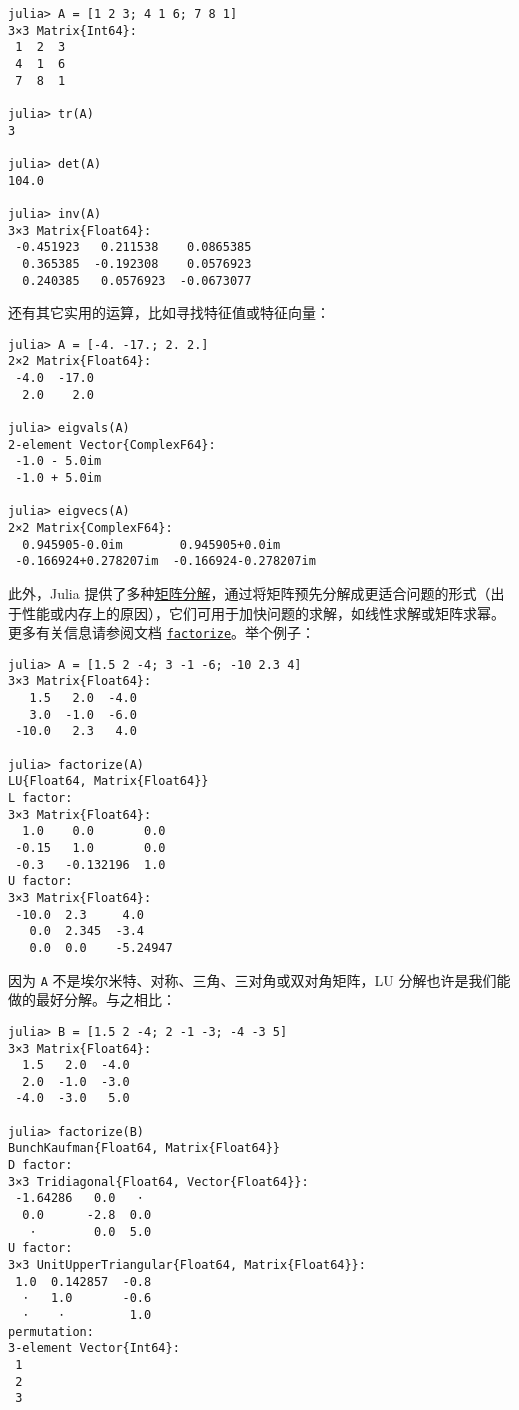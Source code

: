 \begin{verbatim}
julia> A = [1 2 3; 4 1 6; 7 8 1]
3×3 Matrix{Int64}:
 1  2  3
 4  1  6
 7  8  1

julia> tr(A)
3

julia> det(A)
104.0

julia> inv(A)
3×3 Matrix{Float64}:
 -0.451923   0.211538    0.0865385
  0.365385  -0.192308    0.0576923
  0.240385   0.0576923  -0.0673077
\end{verbatim}



还有其它实用的运算，比如寻找特征值或特征向量：




\begin{verbatim}
julia> A = [-4. -17.; 2. 2.]
2×2 Matrix{Float64}:
 -4.0  -17.0
  2.0    2.0

julia> eigvals(A)
2-element Vector{ComplexF64}:
 -1.0 - 5.0im
 -1.0 + 5.0im

julia> eigvecs(A)
2×2 Matrix{ComplexF64}:
  0.945905-0.0im        0.945905+0.0im
 -0.166924+0.278207im  -0.166924-0.278207im
\end{verbatim}



此外，Julia 提供了多种\hyperlink{14017178414387426770}{矩阵分解}，通过将矩阵预先分解成更适合问题的形式（出于性能或内存上的原因），它们可用于加快问题的求解，如线性求解或矩阵求幂。更多有关信息请参阅文档 \hyperlink{7042962205548658937}{\texttt{factorize}}。举个例子：




\begin{verbatim}
julia> A = [1.5 2 -4; 3 -1 -6; -10 2.3 4]
3×3 Matrix{Float64}:
   1.5   2.0  -4.0
   3.0  -1.0  -6.0
 -10.0   2.3   4.0

julia> factorize(A)
LU{Float64, Matrix{Float64}}
L factor:
3×3 Matrix{Float64}:
  1.0    0.0       0.0
 -0.15   1.0       0.0
 -0.3   -0.132196  1.0
U factor:
3×3 Matrix{Float64}:
 -10.0  2.3     4.0
   0.0  2.345  -3.4
   0.0  0.0    -5.24947
\end{verbatim}



因为 \texttt{A} 不是埃尔米特、对称、三角、三对角或双对角矩阵，LU 分解也许是我们能做的最好分解。与之相比：




\begin{verbatim}
julia> B = [1.5 2 -4; 2 -1 -3; -4 -3 5]
3×3 Matrix{Float64}:
  1.5   2.0  -4.0
  2.0  -1.0  -3.0
 -4.0  -3.0   5.0

julia> factorize(B)
BunchKaufman{Float64, Matrix{Float64}}
D factor:
3×3 Tridiagonal{Float64, Vector{Float64}}:
 -1.64286   0.0   ⋅
  0.0      -2.8  0.0
   ⋅        0.0  5.0
U factor:
3×3 UnitUpperTriangular{Float64, Matrix{Float64}}:
 1.0  0.142857  -0.8
  ⋅   1.0       -0.6
  ⋅    ⋅         1.0
permutation:
3-element Vector{Int64}:
 1
 2
 3
\end{verbatim}



